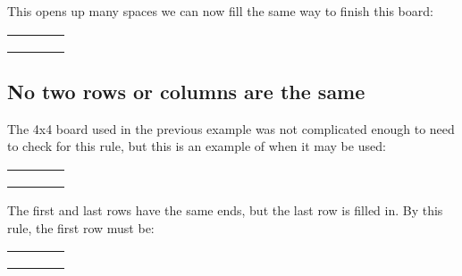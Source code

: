 \documentclass{article}
\begin{document}
This opens up many spaces we can now fill the same way to finish this board:

\begin{center}
\begin{tabular}{|l|l|l|l|}
\hline
\cellcolor{blue} & \cellcolor{blue} & \cellcolor{red} & \cellcolor{red}	\\ \hline
\cellcolor{red} & \cellcolor{red} & \cellcolor{blue} & \cellcolor{blue}	\\ \hline
\cellcolor{red} & \cellcolor{blue} & \cellcolor{red} & \cellcolor{blue}	\\ \hline
\cellcolor{blue} & \cellcolor{red} & \cellcolor{blue} & \cellcolor{red} 	\\ \hline
\end{tabular}
\end{center}

\subsection{No two rows or columns are the same}
The 4x4 board used in the previous example was not complicated enough to need to check for this rule,
but this is an example of when it may be used:

\begin{center}
\begin{tabular}{|l|l|l|l|}
\hline
\cellcolor{blue} &  &  & \cellcolor{red}	\\ \hline
\cellcolor{red} &  &  & \cellcolor{blue}	\\ \hline
\cellcolor{red} & \cellcolor{blue} & \cellcolor{red} & \cellcolor{blue}	\\ \hline
\cellcolor{blue} & \cellcolor{red} & \cellcolor{blue} & \cellcolor{red} 	\\ \hline
\end{tabular}
\end{center}

The first and last rows have the same ends, but the last row is filled in.
By this rule, the first row must be:

\begin{center}
\begin{tabular}{|l|l|l|l|}
\hline
\cellcolor{blue} & \cellcolor{blue} & \cellcolor{red} & \cellcolor{red}	\\ \hline
\cellcolor{red} &  &  & \cellcolor{blue}	\\ \hline
\cellcolor{red} & \cellcolor{blue} & \cellcolor{red} & \cellcolor{blue}	\\ \hline
\cellcolor{blue} & \cellcolor{red} & \cellcolor{blue} & \cellcolor{red} 	\\ \hline
\end{tabular}
\end{center}
\end{document}
